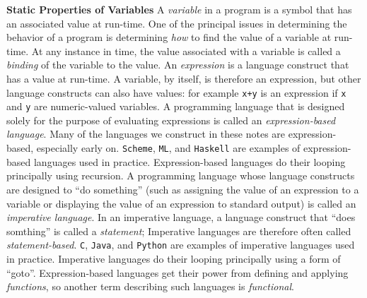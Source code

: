 \begin{minipage}[t]{\sw}
\slidenumber
\LARGE
{\bf Static Properties of Variables}\exx
\Large
A {\em variable} in a program is a symbol
that has an associated value at run-time.
One of the principal issues in determining the behavior of a program
is determining {\em how} to find the value of a variable at run-time.
At any instance in time, the value associated with a variable
is called a {\em binding} of the variable to the value.\exx
An {\em expression} is a language construct that has a value at run-time.
A variable, by itself, is therefore an expression,
but other language constructs can also have values:
for example \verb'x+y' is an expression
if \verb'x' and \verb'y' are numeric-valued variables.\exx
A programming language that is designed solely for the purpose
of evaluating expressions is called an {\em expression-based language}.
Many of the languages we construct in these notes are expression-based,
especially early on.
\verb'Scheme', \verb'ML', and \verb'Haskell' are examples
of expression-based languages used in practice.
Expression-based languages do their looping principally using recursion.\exx
A programming language whose language constructs are designed
to ``do something''
(such as assigning the value of an expression to a variable
or displaying the value of an expression to standard output)
is called an {\em imperative language}.
In an imperative language, a language construct
that ``does somthing'' is called a {\em statement};
Imperative languages are therefore often called {\em statement-based}.
\verb'C', \verb'Java', and \verb'Python' are examples
of imperative languages used in practice.
Imperative languages do their looping principally using a form of ``goto''.\exx
Expression-based languages get their power
from defining and applying {\em functions},
so another term describing such languages is {\em functional}.
\end{minipage}
\clearpage
